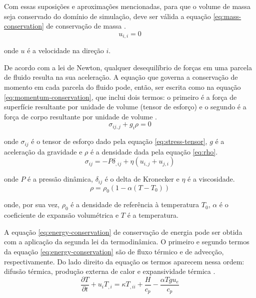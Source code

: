 Com essas suposições e aproximações mencionadas, para que o volume de massa seja conservado do domínio de simulação, deve ser válida a equação \ref{eq:mass-conservation} de conservação de massa \citep{zhong2015treatise,schubert2001mantle}.
\begin{equation}\label{eq:mass-conservation}
    u_{i,i} = 0
\end{equation}

\noindent onde $u$ é a velocidade na direção $i$.

De acordo com a lei de Newton, qualquer desequilíbrio de forças em uma parcela de fluido resulta na sua aceleração. A equação que governa a conservação de momento em cada parcela do fluido pode, então, ser escrita como na equação \ref{eq:momentum-conservation}, que inclui dois termos: o primeiro é a força de superfície resultante por unidade de volume (tensor de esforço) e o segundo é a força de corpo resultante por unidade de volume \citep{zhong2015treatise,schubert2001mantle}.
\begin{equation} \label{eq:momentum-conservation}
    \sigma_{ij,j} + g_{i} \rho = 0
\end{equation}

\noindent onde $\sigma_{ij}$ é o tensor de esforço dado pela equação \ref{eq:stress-tensor}, $g$ é a aceleração da gravidade e $\rho$ é a densidade dada pela equação \ref{eq:rho}.
\begin{equation}\label{eq:stress-tensor}
    \sigma_{ij} = -P \delta_{,ij} + \eta (u_{i,j} + u_{j,i})
\end{equation}

\noindent onde $P$ é a pressão dinâmica,  $\delta_{ij}$ é o delta de Kronecker e $\eta$ é a viscosidade.
\begin{equation}\label{eq:rho}
    \rho = \rho_{0} (1-\alpha(T-T_{0}))
\end{equation}

\noindent onde, por sua vez, $\rho_{0}$ é a densidade de referência à temperatura $T_0$, $\alpha$ é o coeficiente de expansão volumétrica e $T$ é a temperatura.

A equação \ref{eq:energy-conservation} de conservação de energia pode ser obtida com a aplicação da segunda lei da termodinâmica. O primeiro e segundo termos da equação \ref{eq:energy-conservation} são de fluxo térmico e de advecção, respectivamente. Do lado direito da equação os termos aparecem nessa ordem: difusão térmica, produção externa de calor e expansividade térmica \citep{zhong2015treatise,schubert2001mantle}.
\begin{equation}\label{eq:energy-conservation}
    \frac{\partial T}{\partial t} + u_{i} T_{,i} = \kappa T_{,ii} + \frac{H}{c_p} - \frac{\alpha T g u_{e}}{c_p}
\end{equation}

